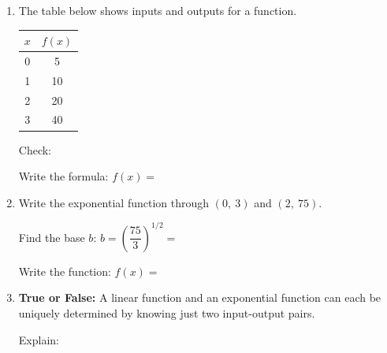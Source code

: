 \documentclass[10pt]{article}
\begin{document}
\namedateperiod

\vspace{0.14in}

\begin{enumerate}[itemsep=20pt]

\item The table below shows inputs and outputs for a function.

      \medskip
      \renewcommand{\arraystretch}{1.3}
      \begin{tabular}{c|c}
        $x$ & $f(x)$ \\ \hline
        0 & 5 \\ 1 & 10 \\ 2 & 20 \\ 3 & 40
      \end{tabular}

      \medskip

      \vspace{0.08in}
      Check: 

      \vspace{0.06in}
      Write the formula: $f(x) = $ 

\item Write the exponential function through $(0,\ 3)$ and $(2,\ 75)$.

      \vspace{0.08in}
      Find the base $b$: $b = \left(\dfrac{75}{3}\right)^{1/2} = $ 

      \vspace{0.08in}
      Write the function: $f(x) = $ 

\item \textbf{True or False:} A linear function and an exponential function can each be
      uniquely determined by knowing just two input-output pairs. \\[6pt]

      \vspace{0.06in}
      Explain: 

\end{enumerate}
\end{document}
